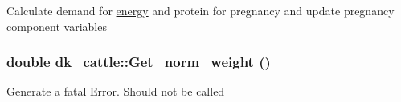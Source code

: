 \label{classdk__cattle_af9b81a29747448215d0dccfae641ee3a}
Calculate demand for \hyperlink{classenergy}{energy} and protein for pregnancy and update pregnancy component variables \hypertarget{classdk__cattle_a2188892a4f9630ccb5ee58ef7fdf26b3}{
\subsubsection[{Get\_\-norm\_\-weight}]{\setlength{\rightskip}{0pt plus 5cm}double dk\_\-cattle::Get\_\-norm\_\-weight ()}}
\label{classdk__cattle_a2188892a4f9630ccb5ee58ef7fdf26b3}
Generate a fatal Error. Should not be called 


